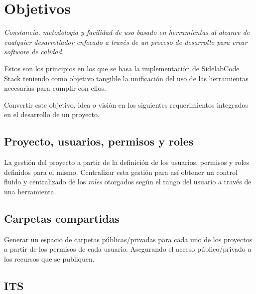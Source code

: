 
\chapter{Objetivos}
\label{chap:objetivos}

\par \emph{Constancia, metodolog\'ia y facilidad de uso basado en herramientas al alcance de cualquier desarrollador enfocado a trav\'es de un proceso de desarrollo para crear software de calidad.}

\par Estos son los principios en los que se basa la implementación de SidelabCode Stack teniendo como objetivo tangible la unificación del uso de las herramientas necesarias para cumplir con ellos.

\par Convertir este objetivo, idea o visión en los siguientes requerimientos integrados en el desarrollo de un proyecto.

\section{Proyecto, usuarios, permisos y roles }
\label{sec:proyecto-usuarios}

\par La gestión del proyecto a partir de la definición de los usuarios, permisos y roles definidos para el mismo. Centralizar esta gestión para así obtener un control fluido y centralizado de los \emph{roles} otorgados según el rango del usuario a través de una herramienta.


\section{Carpetas compartidas}
\label{sec:carpetas-compartidas}

\par Generar un espacio de carpetas p\'ublicas/privadas para cada uno de los proyectos a partir de los permisos de cada usuario. Asegurando el acceso público/privado a los recursos que se publiquen.


\section{ITS}
\label{sec:its}


